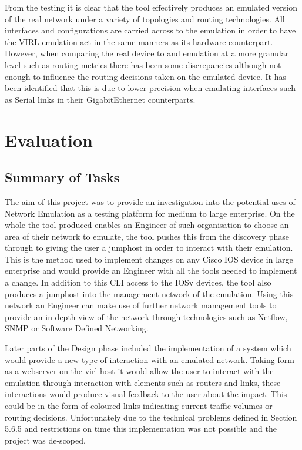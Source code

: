 \documentclass[11pt]{report}
\begin{document}
From the testing it is clear that the tool effectively produces an emulated version of the real network under a variety of topologies and routing technologies. All interfaces and configurations are carried across to the emulation in order to have the VIRL emulation act in the same manners as its hardware counterpart. However, when comparing the real device to and emulation at a more granular level such as routing metrics there has been some discrepancies although not enough to influence the routing decisions taken on the emulated device. It has been identified that this is due to lower precision when emulating interfaces such as Serial links in their GigabitEthernet counterparts.

\chapter{Evaluation}

\section{Summary of Tasks}

The aim of this project was to provide an investigation into the potential uses of Network Emulation as a testing platform for medium to large enterprise. On the whole the tool produced enables an Engineer of such organisation to choose an area of their network to emulate, the tool pushes this from the discovery phase through to giving the user a jumphost in order to interact with their emulation. This is the method used to implement changes on any Cisco IOS device in large enterprise and would provide an Engineer with all the tools needed to implement a change. In addition to this CLI access to the IOSv devices, the tool also produces a jumphost into the management network of the emulation. Using this network an Engineer can make use of further network management tools to provide an in-depth view of the network through technologies such as Netflow, SNMP or Software Defined Networking.

Later parts of the Design phase included the implementation of a system which would provide a new type of interaction with an emulated network. Taking form as a webserver on the virl host it would allow the user to interact with the emulation through interaction with elements such as routers and links, these interactions would produce visual feedback to the user about the impact. This could be in the form of coloured links indicating current traffic volumes or routing decisions. Unfortunately due to the technical problems defined in Section 5.6.5 and restrictions on time this implementation was not possible and the project was de-scoped. 
\end{document}
